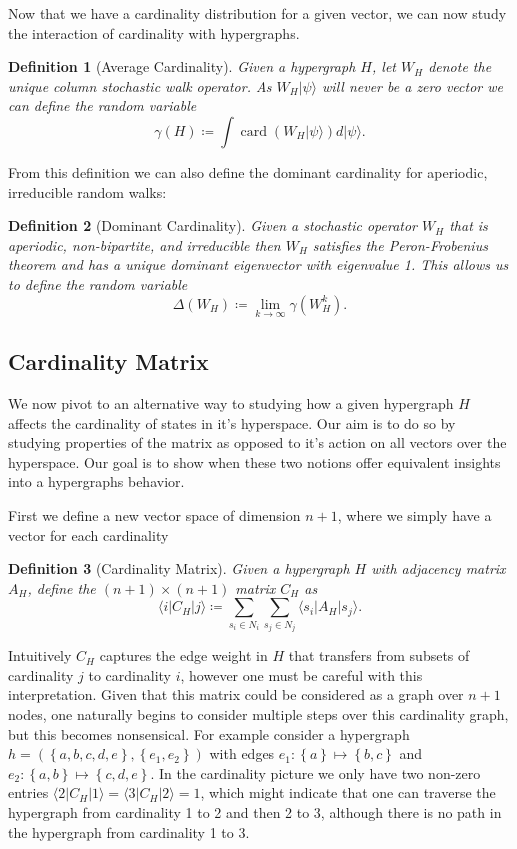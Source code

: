 \documentclass{article}
\newcommand{\ket}[1]{|#1\rangle}
\newcommand{\bra}[1]{\langle #1|}
\newcommand{\parens}[1]{\left( #1 \right)}
\newcommand{\set}[1]{\left\{ #1 \right\}}
\DeclareMathOperator{\card}{card}
\newcommand{\cardi}[1]{\card \parens{ #1 }}
\newcommand{\base}[1]{\ket{s_{#1}}}
\newcommand{\dual}[1]{\bra{s_{#1}}}
\newtheorem{defn}{Definition}
\begin{document}
Now that we have a cardinality distribution for a given vector, we can now study the interaction of cardinality with hypergraphs.
\begin{defn}[Average Cardinality]
    Given a hypergraph $H$, let $W_H$ denote the unique column stochastic walk operator. As $W_H \ket{\psi}$ will never be a zero vector we can define the random variable
    \begin{equation}
        \gamma(H) \coloneqq \int \cardi{W_H \ket{\psi}} d\ket{\psi}.
    \end{equation}
\end{defn}
From this definition we can also define the dominant cardinality for aperiodic, irreducible random walks:
\begin{defn}[Dominant Cardinality]
    Given a stochastic operator $W_H$ that is aperiodic, non-bipartite, and irreducible then $W_H$ satisfies the Peron-Frobenius theorem and has a unique dominant eigenvector with eigenvalue 1. This allows us to define the random variable
    \begin{equation}
        \Delta(W_H) \coloneqq \lim_{k \to \infty} \gamma(W_H^k).
    \end{equation}
\end{defn}

\subsection{Cardinality Matrix}
We now pivot to an alternative way to studying how a given hypergraph $H$ affects the cardinality of states in it's hyperspace. Our aim is to do so by studying properties of the matrix as opposed to it's action on all vectors over the hyperspace. Our goal is to show when these two notions offer equivalent insights into a hypergraphs behavior.

First we define a new vector space of dimension $n+1$, where we simply have a vector for each cardinality
\begin{defn}[Cardinality Matrix]
    Given a hypergraph $H$ with adjacency matrix $A_H$, define the $(n+1) \times (n+1)$ matrix $C_H$ as
    \begin{equation}
        \bra{i} C_H \ket{j} \coloneqq \sum_{s_i \in N_i} \sum_{s_j \in N_j} \dual{i} A_H \base{j}.
    \end{equation}
\end{defn}
Intuitively $C_H$ captures the edge weight in $H$ that transfers from subsets of cardinality $j$ to cardinality $i$, however one must be careful with this interpretation. Given that this matrix could be considered as a graph over $n+1$ nodes, one naturally begins to consider multiple steps over this cardinality graph, but this becomes nonsensical. For example consider a hypergraph $h = (\set{a, b, c, d, e}, \set{e_1, e_2})$ with edges $e_1: \set{a} \mapsto \set{b,c}$ and $e_2: \set{a, b} \mapsto \set{c, d, e}$. In the cardinality picture we only have two non-zero entries $\bra{2} C_{H} \ket{1} = \bra{3} C_H \ket{2} = 1$, which might indicate that one can traverse the hypergraph from cardinality 1 to 2 and then 2 to 3, although there is no path in the hypergraph from cardinality 1 to 3.
\end{document}

